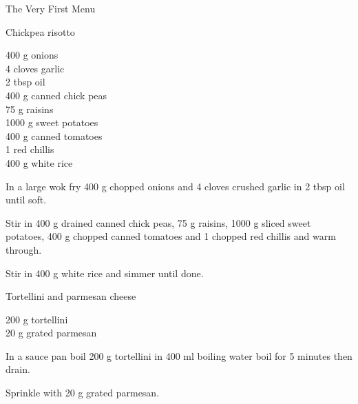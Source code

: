 \begin{menu}{The Very First Menu}
    \begin{recipe}{2}{Chickpea risotto}%
    
		\begin{ingredients}
		400 g onions  \\
	4 cloves garlic  \\
	2 tbsp oil  \\
	400 g canned chick peas  \\
	75 g raisins  \\
	1000 g sweet potatoes  \\
	400 g canned tomatoes  \\
	1  red chillis  \\
	400 g white rice  \\
	
		\end{ingredients}
	
    \begin{instructions}
    \item 
        In a large wok fry
        400 g chopped onions
        and
        4 cloves crushed garlic
        in
        2 tbsp  oil
        until soft.
      \item 
        Stir in
        400 g drained canned chick peas,
        75 g  raisins,
        1000 g sliced sweet potatoes,
        400 g chopped canned tomatoes
        and
        1  chopped red chillis
        and warm through.
      \item 
        Stir in 
        400 g  white rice
        and simmer until done.
      
    \end{instructions}
    \end{recipe}%
  
    \begin{recipe}{1}{Tortellini and parmesan cheese}%
    
		\begin{ingredients}
		200 g tortellini  \\
	20 g grated parmesan  \\
	
		\end{ingredients}
	
    \begin{instructions}
    \item 
      In a
      sauce pan
      boil
      200 g  tortellini
      in
      400 ml  boiling water
      boil for 5 minutes then drain.
    \item 
        Sprinkle with
        20 g  grated parmesan.
      
    \end{instructions}
    \end{recipe}%
  
    \clearpage
    \end{menu}
	
